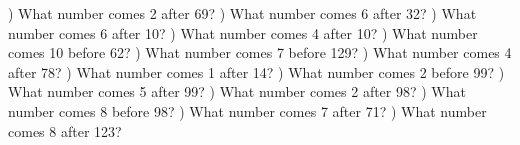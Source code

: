 \documentclass{article}%
\begin{document}
\newline%
) What number comes 2 after 69?%
\newline%
\newline%
) What number comes 6 after 32?%
\newline%
\newline%
) What number comes 6 after 10?%
\newline%
\newline%
) What number comes 4 after 10?%
\newline%
\newline%
) What number comes 10 before 62?%
\newline%
\newline%
) What number comes 7 before 129?%
\newline%
\newline%
) What number comes 4 after 78?%
\newline%
\newline%
) What number comes 1 after 14?%
\newline%
\newline%
) What number comes 2 before 99?%
\newline%
\newline%
) What number comes 5 after 99?%
\newline%
\newline%
) What number comes 2 after 98?%
\newline%
\newline%
) What number comes 8 before 98?%
\newline%
\newline%
) What number comes 7 after 71?%
\newline%
\newline%
) What number comes 8 after 123?%
\newline%
\newline%
\end{document}

